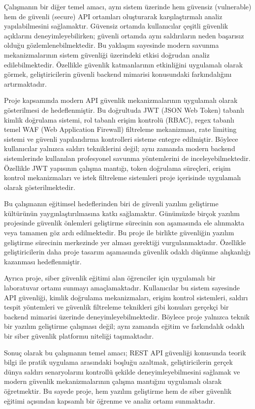 Çalışmanın bir diğer temel amacı, aynı sistem üzerinde hem güvensiz (vulnerable) hem de güvenli (secure) API ortamları oluşturarak karşılaştırmalı analiz yapılabilmesini sağlamaktır. Güvensiz ortamda kullanıcılar çeşitli güvenlik açıklarını deneyimleyebilirken; güvenli ortamda aynı saldırıların neden başarısız olduğu gözlemlenebilmektedir. Bu yaklaşım sayesinde modern savunma mekanizmalarının sistem güvenliği üzerindeki etkisi doğrudan analiz edilebilmektedir. Özellikle güvenlik katmanlarının etkinliğini uygulamalı olarak görmek, geliştiricilerin güvenli backend mimarisi konusundaki farkındalığını artırmaktadır.

Proje kapsamında modern API güvenlik mekanizmalarının uygulamalı olarak gösterilmesi de hedeflenmiştir. Bu doğrultuda JWT (JSON Web Token) tabanlı kimlik doğrulama sistemi, rol tabanlı erişim kontrolü (RBAC), regex tabanlı temel WAF (Web Application Firewall) filtreleme mekanizması, rate limiting sistemi ve güvenli yapılandırma kontrolleri sisteme entegre edilmiştir. Böylece kullanıcılar yalnızca saldırı tekniklerini değil; aynı zamanda modern backend sistemlerinde kullanılan profesyonel savunma yöntemlerini de inceleyebilmektedir. Özellikle JWT yapısının çalışma mantığı, token doğrulama süreçleri, erişim kontrol mekanizmaları ve istek filtreleme sistemleri proje içerisinde uygulamalı olarak gösterilmektedir.

Bu çalışmanın eğitimsel hedeflerinden biri de güvenli yazılım geliştirme kültürünün yaygınlaştırılmasına katkı sağlamaktır. Günümüzde birçok yazılım projesinde güvenlik önlemleri geliştirme sürecinin son aşamasında ele alınmakta veya tamamen göz ardı edilmektedir. Bu proje ile birlikte güvenliğin yazılım geliştirme sürecinin merkezinde yer alması gerektiği vurgulanmaktadır. Özellikle geliştiricilerin daha proje tasarım aşamasında güvenlik odaklı düşünme alışkanlığı kazanması hedeflenmiştir.

Ayrıca proje, siber güvenlik eğitimi alan öğrenciler için uygulamalı bir laboratuvar ortamı sunmayı amaçlamaktadır. Kullanıcılar bu sistem sayesinde API güvenliği, kimlik doğrulama mekanizmaları, erişim kontrol sistemleri, saldırı tespit yöntemleri ve güvenlik filtreleme teknikleri gibi konuları gerçekçi bir backend mimarisi üzerinde deneyimleyebilmektedir. Böylece proje yalnızca teknik bir yazılım geliştirme çalışması değil; aynı zamanda eğitim ve farkındalık odaklı bir siber güvenlik platformu niteliği taşımaktadır.

Sonuç olarak bu çalışmanın temel amacı; REST API güvenliği konusunda teorik bilgi ile pratik uygulama arasındaki boşluğu azaltmak, geliştiricilerin gerçek dünya saldırı senaryolarını kontrollü şekilde deneyimleyebilmesini sağlamak ve modern güvenlik mekanizmalarının çalışma mantığını uygulamalı olarak öğretmektir. Bu sayede proje, hem yazılım geliştirme hem de siber güvenlik eğitimi açısından kapsamlı bir öğrenme ve analiz ortamı sunmaktadır.

